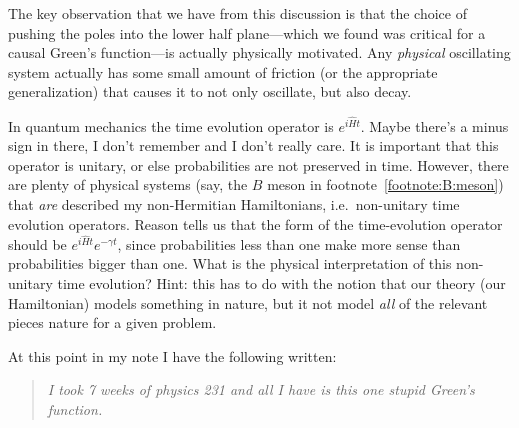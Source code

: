  The key observation that we have from this discussion is that the choice of pushing the poles into the lower half plane---which we found was critical for a causal Green's function---is actually physically motivated. Any \emph{physical} oscillating system actually has some small amount of friction (or the appropriate generalization) that causes it to not only oscillate, but also decay. 
 \begin{exercise}
 In quantum mechanics the time evolution operator is $e^{i\hat H t}$. Maybe there's a minus sign in there, I don't remember and I don't really care. It is important that this operator is unitary, or else probabilities are not preserved in time. However, there are plenty of physical systems (say, the $B$ meson in footnote~\ref{footnote:B:meson}) that \emph{are} described my non-Hermitian Hamiltonians, i.e.~non-unitary time evolution operators. Reason tells us that the form of the time-evolution operator should be $e^{i\hat H t}e^{-\gamma t}$, since probabilities less than one make more sense than probabilities bigger than one. What is the physical interpretation of this non-unitary time evolution? Hint: this has to do with the notion that our theory (our Hamiltonian) models something in nature, but it not model \emph{all} of the relevant pieces nature for a given problem.
 \end{exercise}
 At this point in my note I have the following written:
 \begin{quote}
 \emph{I took 7 weeks of physics 231 and all I have is this one stupid Green's function.}
 \end{quote}
 
 